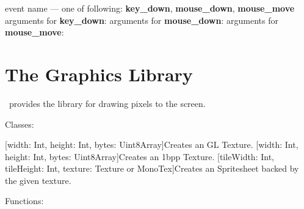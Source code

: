 \begin{outline}
\1event name --- one of following: \textbf{key\_down}, \textbf{mouse\_down}, \textbf{mouse\_move}
\1arguments for \textbf{key\_down}:
 \2
 \2
 \2
\1arguments for \textbf{mouse\_down}:
 \2
 \2
 \2
\1arguments for \textbf{mouse\_move}:
 \2
 \2
 \2
 \2
 \2
\end{outline}

\chapter{The Graphics Library}

\thedos\ provides the library for drawing pixels to the screen.


Classes:

\begin{outline}
\1[width: Int, height: Int, bytes: Uint8Array]{Creates an GL Texture.}
\1[width: Int, height: Int, bytes: Uint8Array]{Creates an 1bpp Texture.}
\1[tileWidth: Int, tileHeight: Int, texture: Texture or MonoTex]{Creates an Spritesheet backed by the given texture.}
\end{outline}

Functions:

